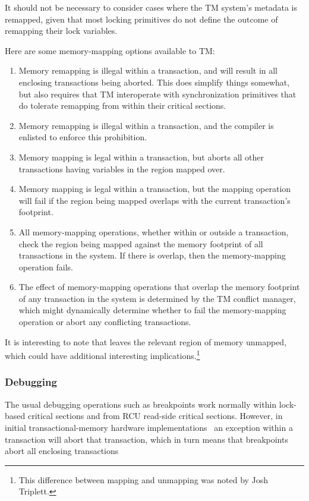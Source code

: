 It should not be necessary to consider cases where the TM system's
metadata is remapped, given that most locking primitives do not define
the outcome of remapping their lock variables.

Here are some memory-mapping options available to TM:

\begin{enumerate}
\item	Memory remapping is illegal within a transaction, and will result
	in all enclosing transactions being aborted.
	This does simplify things somewhat, but also requires that TM
	interoperate with synchronization primitives that do tolerate
	remapping from within their critical sections.
\item	Memory remapping is illegal within a transaction, and the
	compiler is enlisted to enforce this prohibition.
\item	Memory mapping is legal within a transaction, but aborts all
	other transactions having variables in the region mapped over.
\item	Memory mapping is legal within a transaction, but the mapping
	operation will fail if the region being mapped overlaps with
	the current transaction's footprint.
\item	All memory-mapping operations, whether within or outside a
	transaction, check the region being mapped against the memory
	footprint of all transactions in the system.
	If there is overlap, then the memory-mapping operation fails.
\item	The effect of memory-mapping operations that overlap the memory
	footprint of any transaction in the system is determined by the
	TM conflict manager, which might dynamically determine whether
	to fail the memory-mapping operation or abort any conflicting
	transactions.
\end{enumerate}

It is interesting to note that  leaves the relevant region
of memory unmapped, which could have additional interesting
implications.\footnote{
	This difference between mapping and unmapping was noted by
	Josh Triplett.}

\subsubsection{Debugging}
\label{sec:future:Debugging}

The usual debugging operations such as breakpoints work normally within
lock-based critical sections and from RCU read-side critical sections.
However, in initial transactional-memory hardware
implementations~\cite{DaveDice2009ASPLOSRockHTM} an exception within
a transaction will abort that transaction, which in turn means that
breakpoints abort all enclosing transactions

